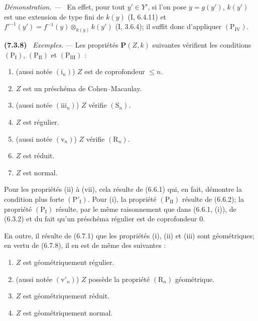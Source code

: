 \documentclass[10pt,oneside]{book}
\newenvironment{env}[1][]{\par\medskip\noindent\textbf{(#1)}\ }{\par}
\newenvironment{proof}{%
  \par\medskip\noindent\textit{Démonstration. ---\ }}{\par}
\begin{document}
\begin{proof}
En effet, pour tout $y'\in Y'$, si l'on pose $y=g(y')$, $k(y')$ est une
extension de type fini de $k(y)$ (I, 6.4.11) et
$f'^{-1}(y')=f^{-1}(y)\otimes_{k(y)}k(y')$ (I, 3.6.4); il suffit donc
d'appliquer $(\mathrm P_{\mathrm{IV}})$.
\end{proof}

\begin{env}[7.3.8]
\label{IV.2.s7.3.8-fr}
\emph{Exemples.} --- Les propriétés $\boldsymbol P(Z,k)$ suivantes
vérifient les conditions $(\mathrm P_{\mathrm I})$,
$(\mathrm P_{\mathrm{II}})$ et $(\mathrm P_{\mathrm{III}})$ :
\begin{enumerate}
\item[(i)] (aussi notée $(\mathrm i_n)$) $Z$ est de coprofondeur
$\leqslant n$.
\item[(ii)] $Z$ est un préschéma de Cohen--Macaulay.
\item[(iii)] (aussi notée $(\mathrm{iii}_n)$) $Z$ vérifie $(\mathrm S_n)$.
\item[(iv)] $Z$ est régulier.
\item[(v)] (aussi notée $(\mathrm v_n)$) $Z$ vérifie $(\mathrm R_n)$.
\item[(vi)] $Z$ est réduit.
\item[(vii)] $Z$ est normal.
\end{enumerate}
Pour les propriétés (ii) à (vii), cela résulte de (6.6.1) qui, en fait,
démontre la condition plus forte $(\mathrm P'_{\mathrm I})$. Pour (i), la
propriété $(\mathrm P_{\mathrm{II}})$ résulte de (6.6.2); la propriété
$(\mathrm P_{\mathrm I})$ résulte, par le même raisonnement que dans
(6.6.1, (i)), de (6.3.2) et du fait qu'un préschéma régulier est de
coprofondeur 0.

En outre, il résulte de (6.7.1) que les propriétés (i), (ii) et (iii) sont
géométriques; en vertu de (6.7.8), il en est de même des suivantes :
\begin{enumerate}
\item[(iv$'$)] $Z$ est géométriquement régulier.
\item[(v$'$)] (aussi notée $(\mathrm v'_n)$) $Z$ possède la propriété
$(\mathrm R_n)$ géométrique.
\item[(vi$'$)] $Z$ est géométriquement réduit.
\item[(vii$'$)] $Z$ est géométriquement normal.
\end{enumerate}
\end{env}
\end{document}
